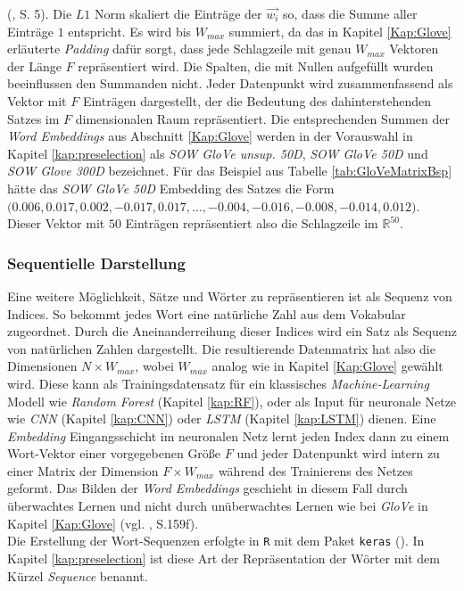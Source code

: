 \documentclass[a4paper,11pt]{article}
\begin{document}
(\cite{sumsWords}, S. 5). Die $L1$ Norm skaliert die Einträge der $\Vec{w_i}$ so, dass die Summe aller Einträge $1$ entspricht. Es wird bis $W_{max}$ summiert, da das in Kapitel \ref{Kap:Glove} erläuterte \textit{Padding} dafür sorgt, dass jede Schlagzeile mit genau $W_{max}$ Vektoren der Länge $F$ repräsentiert wird. Die Spalten, die mit Nullen aufgefüllt wurden beeinflussen den Summanden nicht.
Jeder Datenpunkt wird zusammenfassend als Vektor mit $F$ Einträgen dargestellt, der die Bedeutung des dahinterstehenden Satzes im $F$ dimensionalen Raum repräsentiert. Die entsprechenden Summen der \textit{Word Embeddings} aus Abschnitt \ref{Kap:Glove} werden in der Vorauswahl in Kapitel \ref{kap:preselection} als \textit{SOW GloVe unsup. 50D}, \textit{SOW GloVe 50D} und \textit{SOW Glove 300D} bezeichnet.
Für das Beispiel aus Tabelle \ref{tab:GloVeMatrixBsp} hätte das \textit{SOW GloVe 50D} Embedding des Satzes
 die Form \\
$\textbf{(}0.006, 0.017,  0.002, -0.017,  0.017, \dots , -0.004, -0.016, -0.008, -0.014, 0.012 \textbf{)}$. Dieser Vektor mit $50$ Einträgen repräsentiert also die Schlagzeile im $\mathbb{R}^{50}$.


\subsubsection{Sequentielle Darstellung} \label{Kap:Seq}

Eine weitere Möglichkeit, Sätze und Wörter zu repräsentieren ist als Sequenz von Indices. So bekommt jedes Wort eine natürliche Zahl aus dem Vokabular zugeordnet. Durch die Aneinanderreihung dieser Indices wird ein Satz als Sequenz von natürlichen Zahlen dargestellt. Die resultierende Datenmatrix hat also die Dimensionen $N \times W_{max}$, wobei $W_{max}$ analog wie in Kapitel \ref{Kap:Glove} gewählt wird. Diese kann als Trainingsdatensatz für ein klassisches \textit{Machine-Learning} Modell wie \textit{Random Forest} (Kapitel \ref{kap:RF}), oder als Input für neuronale Netze wie \textit{CNN} (Kapitel \ref{kap:CNN}) oder \textit{LSTM} (Kapitel \ref{kap:LSTM}) dienen. Eine \textit{Embedding} Eingangsschicht im neuronalen Netz lernt jeden Index dann zu einem Wort-Vektor einer vorgegebenen Größe $F$ und jeder Datenpunkt wird intern zu einer Matrix der Dimension $F \times W_{max}$ während des Trainierens des Netzes geformt. Das Bilden der \textit{Word Embeddings} geschieht in diesem Fall durch überwachtes Lernen und nicht durch unüberwachtes Lernen wie bei \textit{GloVe} in Kapitel \ref{Kap:Glove} (vgl. \cite{keras}, S.159f).\\
Die Erstellung der Wort-Sequenzen erfolgte in \texttt{R} mit dem Paket \texttt{keras} (\cite{kerasR}). In Kapitel \ref{kap:preselection} ist diese Art der Repräsentation der Wörter mit dem Kürzel \textit{Sequence} benannt. \\
\end{document}
